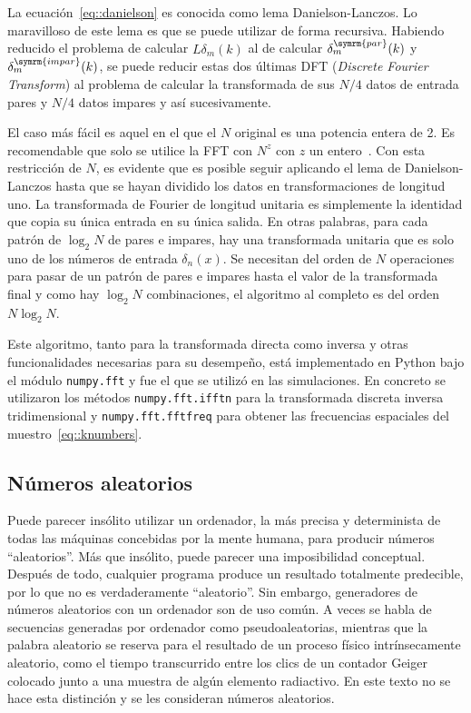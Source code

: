La ecuación~\eqref{eq::danielson} es conocida como lema Danielson-Lanczos. Lo maravilloso de este lema es que se puede utilizar de forma recursiva. Habiendo reducido el problema de calcular \(L\delta_m(k)\) al de calcular \(\delta_m^{\symrm{par}}(k)\) y \(\delta_m^{\symrm{impar}}(k)\), se puede reducir estas dos últimas DFT (\textit{Discrete Fourier Transform}) al problema de calcular la transformada de sus \(N/4\) datos de entrada pares y \(N/4\) datos impares y así sucesivamente.

El caso más fácil es aquel en el que el \(N\) original es una potencia entera de 2. Es recomendable que solo se utilice la FFT con \(N^z\) con \(z\) un entero~\cite{press2007numerical}. Con esta restricción de \(N\), es evidente que es posible seguir aplicando el lema de Danielson-Lanczos hasta que se hayan dividido los datos en transformaciones de longitud uno. La transformada de Fourier de longitud unitaria es simplemente la identidad que copia su única entrada en su única salida. En otras palabras, para cada patrón de \(\log_2N\) de pares e impares, hay una transformada unitaria que es solo uno de los números de entrada \(\delta_n(x)\). Se necesitan del orden de \(N\) operaciones para pasar de un patrón de pares e impares hasta el valor de la transformada final y como hay \(\log_2N\) combinaciones, el algoritmo al completo es del orden \(N\log_2N\).

Este algoritmo, tanto para la transformada directa como inversa y otras funcionalidades necesarias para su desempeño, está implementado en Python bajo el módulo \texttt{numpy.fft} y fue el que se utilizó en las simulaciones. En concreto se utilizaron los métodos \texttt{numpy.fft.ifftn} para la transformada discreta inversa tridimensional y \texttt{numpy.fft.fftfreq} para obtener las frecuencias espaciales del muestro~\eqref{eq::knumbers}.
\subsection{Números aleatorios}
Puede parecer insólito utilizar un ordenador, la más precisa y determinista de todas las máquinas concebidas por la mente humana, para producir números ``aleatorios''. Más que insólito, puede parecer una imposibilidad conceptual. Después de todo, cualquier programa produce un resultado totalmente predecible, por lo que no es verdaderamente ``aleatorio''. Sin embargo, generadores de números aleatorios con un ordenador son de uso común. A veces se habla de secuencias generadas por ordenador como pseudoaleatorias, mientras que la palabra aleatorio se reserva para el resultado de un proceso físico intrínsecamente aleatorio, como el tiempo transcurrido entre los clics de un contador Geiger colocado junto a una muestra de algún elemento radiactivo. En este texto no se hace esta distinción y se les consideran números aleatorios.

